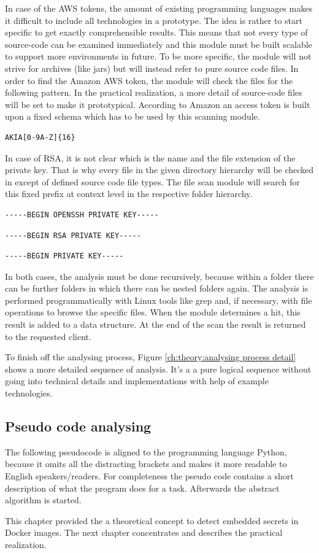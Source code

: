 In case of the AWS tokens, the amount of existing programming languages makes it difficult to include all technologies in a prototype. The idea is rather to start specific to get exactly comprehensible results. This means that not every type of source-code can be examined immediately and this module must be built scalable to support more environments in future.
To be more specific, the module will not strive for archives (like jars) but will instead refer to pure source code files.
In order to find the Amazon AWS token, the module will check the files for the following pattern. In the practical realization, a more detail of source-code files will be set to make it prototypical.
According to Amazon an access token is built upon a fixed schema which has to be used by this scanning module.
\begin{lstlisting}
AKIA[0-9A-Z]{16}
\end{lstlisting}

In case of RSA, it is not clear which is the name and the file extension of the private key. That is why every file in the given directory hierarchy will be checked in except of defined source code file types.
The file scan module will search for this fixed prefix at context level in the respective folder hierarchy.
\begin{lstlisting}
-----BEGIN OPENSSH PRIVATE KEY-----
\end{lstlisting}
\begin{lstlisting}
-----BEGIN RSA PRIVATE KEY-----
\end{lstlisting}
\begin{lstlisting}
-----BEGIN PRIVATE KEY-----
\end{lstlisting}

In both cases, the analysis must be done recursively, because within a folder there can be further folders in which there can be nested folders again.
The analysis is performed programmatically with Linux tools like grep and, if necessary, with file operations to browse the specific files.
When the module determines a hit, this result is added to a data structure. At the end of the scan the result is returned to the requested client.

To finish off the analysing process, Figure \ref{ch:theory:analysing process detail} shows a more detailed sequence of analysis.
It's a a pure logical sequence without going into technical details and implementations with help of example technologies. 

\subsection{Pseudo code analysing}
\label{ch:theory:analysing_pseudocode}
The following pseudocode is aligned to the programming language Python, because it omits all the distracting brackets and makes it more readable to English speakers/readers.
For completeness the pseudo code contains a short description of what the program does for a task. Afterwards the abstract algorithm is started.


This chapter provided the a theoretical concept to detect embedded secrets in Docker images. The next chapter concentrates and describes the practical realization.
